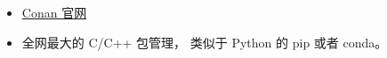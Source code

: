 
\begin{issues}
\issueDraft
\end{issues}

\begin{itemize}
\item \href{https://conan.io/center/}{Conan 官网}
\item 全网最大的 C/C++ 包管理， 类似于  Python 的 pip 或者 conda。
\end{itemize}
